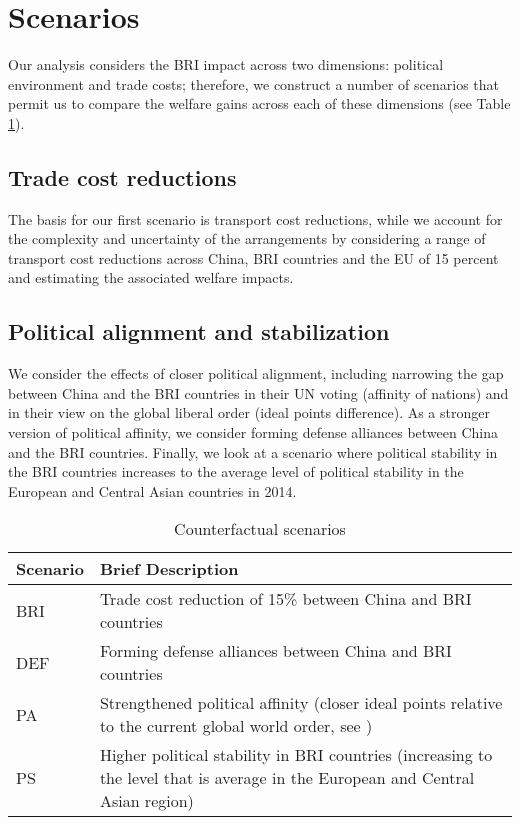 \section{Scenarios}
Our analysis considers the BRI impact across two dimensions: political environment and trade costs; therefore, we construct a number of scenarios that permit us to compare the welfare gains across each of these dimensions (see Table \ref{tab:scenarios}).

\subsection{Trade cost reductions}
The basis for our first scenario is transport cost reductions, while we account for the complexity and uncertainty of the arrangements by considering a range of transport cost reductions across China, BRI countries and the EU of 15 percent and estimating the associated welfare impacts. 

\subsection{Political alignment and stabilization}
We consider the effects of closer political alignment, including narrowing the gap between China and the BRI countries in their UN voting (affinity of nations) and in their view on the global liberal order (ideal points difference). As a stronger version of political affinity, we consider forming defense alliances between China and the BRI countries. Finally, we look at a scenario where political stability in the BRI countries increases to the average level of political stability in the European and Central Asian countries in 2014.

\begin{table}
    \caption{Counterfactual scenarios}
    \label{tab:scenarios}
    \centering
    \begin{tabular}{l|l}
    \toprule
        Scenario  & Brief Description  \\
        \midrule
         BRI & \multicolumn{1}{m{11cm}}{Trade cost reduction of 15\% between China and BRI countries} \\
         DEF & \multicolumn{1}{m{11cm}}{Forming defense alliances between China and BRI countries} \\
         PA & \multicolumn{1}{m{11cm}}{Strengthened political affinity (closer ideal points relative to the current global world order, see \cite{Bailey2017EstimatingData})} \\
         PS & \multicolumn{1}{m{11cm}}{Higher political stability in BRI countries (increasing to the level that is average in the European and Central Asian region)} \\
         \bottomrule
    \end{tabular}
    
\end{table}

